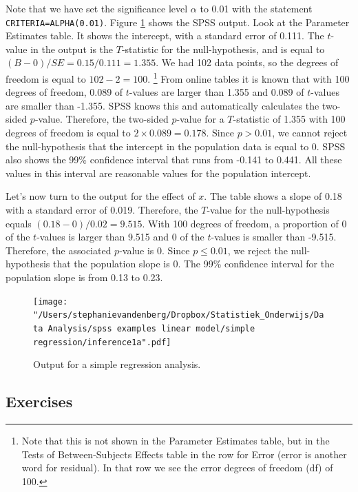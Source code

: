 \documentclass[]{report}\usepackage[]{graphicx}\usepackage[]{color}
\begin{document}
Note that we have set the significance level $\alpha$ to 0.01 with the statement \texttt{CRITERIA=ALPHA(0.01)}. Figure \ref{fig:inf_29} shows the SPSS output. Look at the Parameter Estimates table. It shows the intercept, with a standard error of 0.111. The $t$-value in the output is the $T$-statistic for the null-hypothesis, and is equal to $(B-0)/SE=0.15/0.111=1.355$. We had 102 data points, so the degrees of freedom is equal to $102-2=100$. \footnote{Note that this is not shown in the Parameter Estimates table, but in the Tests of Between-Subjects Effects table in the row for Error (error is another word for residual). In that row we see the error degrees of freedom (df) of 100.} From online tables it is known that with 100 degrees of freedom, 0.089 of $t$-values are larger than 1.355 and 0.089 of $t$-values are smaller than -1.355. SPSS knows this and automatically calculates the two-sided $p$-value. Therefore, the two-sided $p$-value for a $T$-statistic of 1.355 with 100 degrees of freedom is equal to $2 \times 0.089 = 0.178$. Since $p > 0.01$, we cannot reject the null-hypothesis that the intercept in the population data is equal to 0. SPSS also shows the 99\% confidence interval that runs from -0.141 to 0.441. All these values in this interval are reasonable values for the population intercept.

Let's now turn to the output for the effect of $x$. The table shows a slope of 0.18 with a standard error of 0.019. Therefore, the $T$-value for the null-hypothesis equals $(0.18-0)/0.02=9.515$. With 100 degrees of freedom, a proportion of 0 of the $t$-values is larger than 9.515 and 0 of the $t$-values is smaller than -9.515. Therefore, the associated $p$-value is 0. Since $p \leq 0.01$, we reject the null-hypothesis that the population slope is 0. The 99\% confidence interval for the population slope is from 0.13 to 0.23.

\begin{figure}[h!]
    \begin{center}
       \texttt{[image: "/Users/stephanievandenberg/Dropbox/Statistiek\_Onderwijs/Data Analysis/spss examples linear model/simple regression/inference1a".pdf]}
    \end{center}
    \caption{Output for a simple regression analysis.}
    \label{fig:inf_29}
\end{figure}


\subsection{Exercises}
\end{document}

